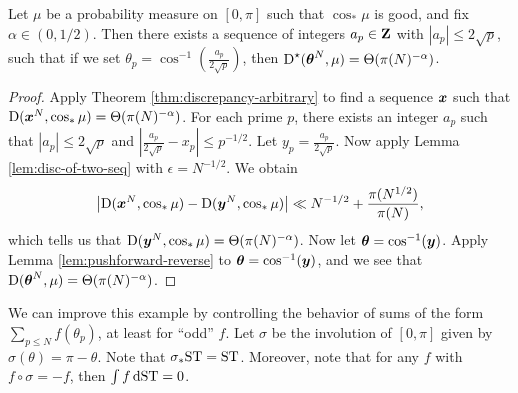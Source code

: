 \begin{theorem}
Let $\mu$ be a probability measure on $[0,\pi]$ such that $\cos_\ast\mu$ is 
good, and fix $\alpha\in (0,1/2)$. Then there exists a sequence of integers 
$a_p\in \mathbf{Z}$ with $|a_p|\leqslant 2\sqrt p$, such that if we set 
$\theta_p = \cos^{-1}\left(\frac{a_p}{2\sqrt p}\right)$, then 
$\operatorname{D}^\star({\boldsymbol\theta}^N,\mu) = \Theta(\pi(N)^{-\alpha})$. 
\end{theorem}
\begin{proof}
Apply Theorem \ref{thm:discrepancy-arbitrary} to find a sequence ${\boldsymbol x}$ such 
that $\operatorname{D}({\boldsymbol x}^N,\cos_\ast \mu) = \Theta(\pi(N)^{-\alpha})$. For each prime 
$p$, there exists an integer $a_p$ such that $|a_p|\leqslant 2\sqrt p$ and 
$\left| \frac{a_p}{2\sqrt p} - x_p\right| \leqslant p^{-1/2}$. Let 
$y_p = \frac{a_p}{2\sqrt p}$. Now apply 
Lemma \ref{lem:disc-of-two-seq} with $\epsilon = N^{-1/2}$. We obtain 
\[
	\left| \operatorname{D}({\boldsymbol x}^N,\cos_\ast \mu) - \operatorname{D}({\boldsymbol y}^N, \cos_\ast \mu)\right| \ll  N^{-1/2} + \frac{\pi(N^{1/2})}{\pi(N)} ,
\]
which tells us that $\operatorname{D}({\boldsymbol y}^N,\cos_\ast\mu) = \Theta(\pi(N)^{-\alpha})$. 
Now let ${\boldsymbol\theta} = \cos^{-1}({\boldsymbol y})$. Apply Lemma \ref{lem:pushforward-reverse} to 
${\boldsymbol\theta} = \cos^{-1}({\boldsymbol y})$, and we see that 
$\operatorname{D}({\boldsymbol\theta}^N,\mu) = \Theta(\pi(N)^{-\alpha})$. 
\end{proof}

We can improve this example by controlling the behavior of sums of the form 
$\sum_{p\leqslant N} f(\theta_p)$, at least for ``odd'' $f$. Let $\sigma$ be 
the involution of $[0,\pi]$ given by $\sigma(\theta) = \pi-\theta$. Note that 
$\sigma_\ast \mathrm{ST} = \mathrm{ST}$. Moreover, note that for any $f$ with 
$f\circ \sigma = -f$, then $\int f\, \mathrm{d}\mathrm{ST} = 0$. 

